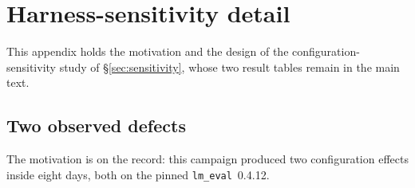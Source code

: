 %
%

\section{Harness-sensitivity detail}
\label{app:harness-detail}

This appendix holds the motivation and the design of the configuration-sensitivity
study of \S\ref{sec:sensitivity}, whose two result tables remain in the main text.

\subsection{Two observed defects}
\label{app:sensitivity:motivation}

The motivation is on the record: this campaign produced two configuration
effects inside eight days, both on the pinned \texttt{lm\_eval}~0.4.12.

